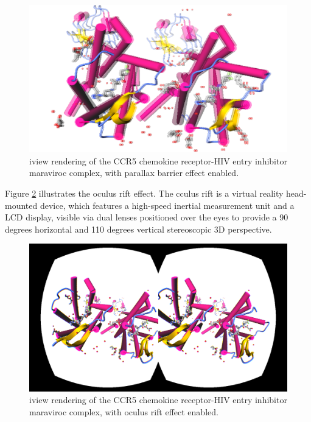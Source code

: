\begin{figure}
\begin{center}
\includegraphics[width=\linewidth]{../iview/parallaxbarrier.png}
\end{center}
\caption{iview rendering of the CCR5 chemokine receptor-HIV entry inhibitor maraviroc complex, with parallax barrier effect enabled.}
\label{fig:parallaxbarrier}
\end{figure}

Figure \ref{fig:oculusrift} illustrates the oculus rift effect. The cculus rift is a virtual reality head-mounted device, which features a high-speed inertial measurement unit and a LCD display, visible via dual lenses positioned over the eyes to provide a 90 degrees horizontal and 110 degrees vertical stereoscopic 3D perspective.

\begin{figure}
\begin{center}
\includegraphics[width=\linewidth]{../iview/oculusrift.png}
\end{center}
\caption{iview rendering of the CCR5 chemokine receptor-HIV entry inhibitor maraviroc complex, with oculus rift effect enabled.}
\label{fig:oculusrift}
\end{figure}

